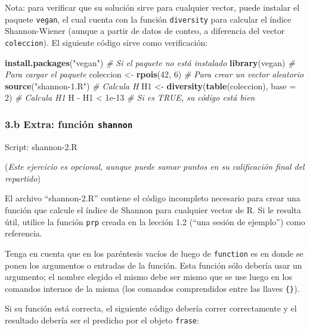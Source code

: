 \documentclass[]{article}
\newenvironment{Shaded}{}{}
\newcommand{\KeywordTok}[1]{\textcolor[rgb]{0.00,0.44,0.13}{\textbf{{#1}}}}
\newcommand{\DataTypeTok}[1]{\textcolor[rgb]{0.56,0.13,0.00}{{#1}}}
\newcommand{\DecValTok}[1]{\textcolor[rgb]{0.25,0.63,0.44}{{#1}}}
\newcommand{\FloatTok}[1]{\textcolor[rgb]{0.25,0.63,0.44}{{#1}}}
\newcommand{\StringTok}[1]{\textcolor[rgb]{0.25,0.44,0.63}{{#1}}}
\newcommand{\CommentTok}[1]{\textcolor[rgb]{0.38,0.63,0.69}{\textit{{#1}}}}
\newcommand{\NormalTok}[1]{{#1}}
\begin{document}
Nota: para verificar que su solución sirve para cualquier vector, puede
instalar el paquete \texttt{vegan}, el cual cuenta con la función
\texttt{diversity} para calcular el índice Shannon-Wiener (aunque a
partir de datos de conteo, a diferencia del vector \texttt{coleccion}).
El siguiente código sirve como verificación:

\begin{Shaded}
\begin{Highlighting}[]
\KeywordTok{install.packages}\NormalTok{(}\StringTok{"vegan"}\NormalTok{)  }\CommentTok{# Si el paquete no está instalado}
\KeywordTok{library}\NormalTok{(vegan)  }\CommentTok{# Para cargar el paquete}
\NormalTok{coleccion <- }\KeywordTok{rpois}\NormalTok{(}\DecValTok{42}\NormalTok{, }\DecValTok{6}\NormalTok{)  }\CommentTok{# Para crear un vector aleatorio}
\KeywordTok{source}\NormalTok{(}\StringTok{"shannon-1.R"}\NormalTok{)  }\CommentTok{# Calcula H}
\NormalTok{H1 <- }\KeywordTok{diversity}\NormalTok{(}\KeywordTok{table}\NormalTok{(coleccion), }\DataTypeTok{base =} \DecValTok{2}\NormalTok{)  }\CommentTok{# Calcula H1}
\NormalTok{H - H1 < }\FloatTok{1e-13}  \CommentTok{# Si es TRUE, su código está bien}
\end{Highlighting}
\end{Shaded}
\subsubsection{3.b Extra: función \texttt{shannon}}

Script: shannon-2.R

(\emph{Este ejercicio es opcional, aunque puede sumar puntos en su
calificación final del repartido})

El archivo ``shannon-2.R'' contiene el código incompleto necesario para
crear una función que calcule el índice de Shannon para cualquier vector
de R. Si le resulta útil, utilice la función \texttt{prp} creada en la
lección 1.2 (``una sesión de ejemplo'') como referencia.

Tenga en cuenta que en los paréntesis vacíos de luego de
\texttt{function} es en donde se ponen los argumentos o entradas de la
función. Esta función sólo debería usar un argumento; el nombre elegido
el mismo debe ser mismo que se use luego en los comandos internos de la
misma (los comandos comprendidos entre las llaves \texttt{\{\}}).

Si su función está correcta, el siguiente código debería correr
correctamente y el resultado debería ser el predicho por el objeto
\texttt{frase}:
\end{document}
